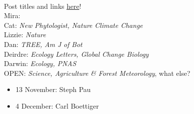 \documentclass[11pt]{article}
\newenvironment{smitemize}{
\begin{itemize}
  \setlength{\itemsep}{0pt}
  \setlength{\parskip}{0.8pt}
  \setlength{\parsep}{0pt}}
{\end{itemize}
}
\begin{document}
\vspace{10pt}\\
 Post titles and links \href{https://docs.google.com/document/d/1j0WdDbjdp8ERLSO7whvtnP-tOblYMlX33TSCXy_uRKo/edit?usp=sharing}{\underline{here}}!\\
Mira: \\
Cat: \emph{New Phytologist, Nature Climate Change}\\
Lizzie: \emph{Nature}\\
Dan: \emph{TREE, Am J of Bot }\\
Deirdre: \emph{Ecology Letters, Global Change Biology}\\
Darwin: \emph{Ecology, PNAS}\\
OPEN: \emph{Science, Agriculture \& Forest Meteorology}, what else?\\

\begin{smitemize}
\item 13 November: Steph Pau
\item 4 December: Carl Boettiger
\end{smitemize}
\end{document}

